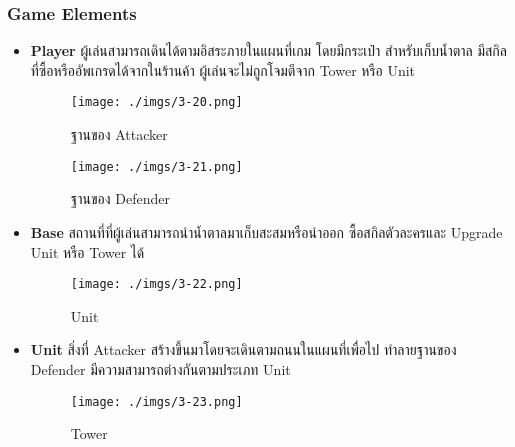 \documentclass[12pt,oneside,openright,a4paper]{cpe-thai-project}
\begin{document}
\subsubsection{Game Elements}
\begin{itemize}

  \begin{figure}[H]\centering
    \begin{minipage}{.3\textwidth}
      \centering
      \texttt{[image: ./imgs/3-18.png]}
      \caption{ตัวละคร Attacker}\label{fig:3-18}
    \end{minipage}
    \begin{minipage}{.3\textwidth}
      \centering
      \texttt{[image: ./imgs/3-19.png]}
      \caption{ตัวละคร Defender}\label{fig:3-19}
    \end{minipage}
  \end{figure}

  \item \textbf{Player} ผู้เล่นสามารถเดินได้ตามอิสระภายในแผนที่เกม โดยมีกระเป๋า
  สำหรับเก็บน้ำตาล มีสกิลที่ซื้อหรืออัพเกรดได้จากในร้านค้า
  ผู้เล่นจะไม่ถูกโจมตีจาก Tower หรือ Unit


  \begin{figure}[H]\centering
    \begin{minipage}{.3\textwidth}
      \centering
      \texttt{[image: ./imgs/3-20.png]}
      \caption{ฐานของ Attacker}\label{fig:3-20}
    \end{minipage}
    \begin{minipage}{.3\textwidth}
      \centering
      \texttt{[image: ./imgs/3-21.png]}
      \caption{ฐานของ Defender}\label{fig:3-21}
    \end{minipage}
  \end{figure}

  \item \textbf{Base} สถานที่ที่ผู้เล่นสามารถนำน้ำตาลมาเก็บสะสมหรือนำออก 
  ซื้อสกิลตัวละครและ Upgrade Unit หรือ Tower ได้


  \begin{figure}[H]\centering
    \texttt{[image: ./imgs/3-22.png]}
    \caption{Unit}\label{fig:3-22}
  \end{figure}

  \item \textbf{Unit} สิ่งที่ Attacker สร้างขึ้นมาโดยจะเดินตามถนนในแผนที่เพื่อไป
  ทำลายฐานของ Defender มีความสามารถต่างกันตามประเภท Unit

  \begin{figure}[H]\centering
    \texttt{[image: ./imgs/3-23.png]}
    \caption{Tower}\label{fig:3-23}
  \end{figure}


\end{itemize}
\end{document}
